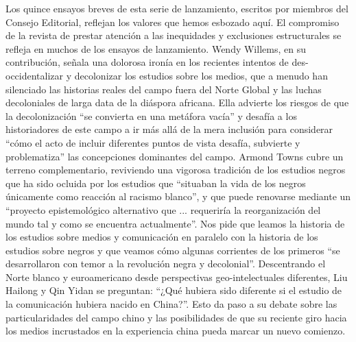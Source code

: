 \documentclass{tufte-handout}
\begin{document}
Los quince ensayos breves de esta serie de lanzamiento, escritos por
miembros del Consejo Editorial, reflejan los valores que hemos esbozado
aquí. El compromiso de la revista de prestar atención a las inequidades
y exclusiones estructurales se refleja en muchos de los ensayos de
lanzamiento. Wendy Willems, en su contribución, señala una dolorosa
ironía en los recientes intentos de des-occidentalizar y decolonizar los
estudios sobre los medios, que a menudo han silenciado las historias
reales del campo fuera del Norte Global y las luchas decoloniales de
larga data de la diáspora africana. Ella advierte los riesgos de que la
decolonización ``se convierta en una metáfora vacía'' y desafía a los
historiadores de este campo a ir más allá de la mera inclusión para
considerar ``cómo el acto de incluir diferentes puntos de vista desafía,
subvierte y problematiza'' las concepciones dominantes del campo. Armond
Towns cubre un terreno complementario, reviviendo una vigorosa tradición
de los estudios negros que ha sido ocluida por los estudios que
``situaban la vida de los negros únicamente como reacción al racismo
blanco'', y que puede renovarse mediante un ``proyecto epistemológico
alternativo que ... requeriría la reorganización del mundo tal y como se
encuentra actualmente''. Nos pide que leamos la historia de los estudios
sobre medios y comunicación en paralelo con la historia de los estudios
sobre negros y que veamos cómo algunas corrientes de los primeros ``se
desarrollaron con temor a la revolución negra y decolonial''.
Descentrando el Norte blanco y euroamericano desde perspectivas
geo-intelectuales diferentes, Liu Hailong y Qin Yidan se preguntan:
``¿Qué hubiera sido diferente si el estudio de la comunicación hubiera
nacido en China?''. Esto da paso a su debate sobre las particularidades
del campo chino y las posibilidades de que su reciente giro hacia los
medios incrustados en la experiencia china pueda marcar un nuevo
comienzo.
\end{document}
